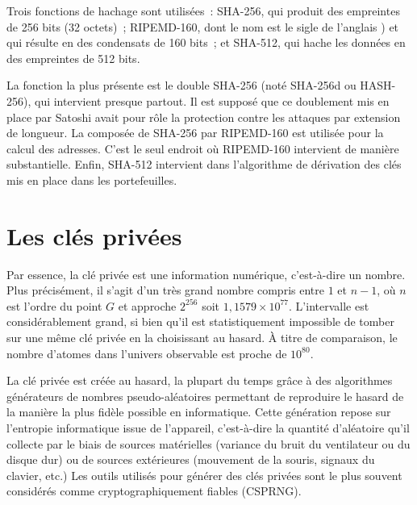 Trois fonctions de hachage sont utilisées~: SHA-256, qui produit des empreintes de 256 bits (32 octets)~; RIPEMD-160, dont le nom est le sigle de l'anglais ) et qui résulte en des condensats de 160 bits~; et SHA-512, qui hache les données en des empreintes de 512 bits.

La fonction la plus présente est le double SHA-256 (noté SHA-256d ou HASH-256), qui intervient presque partout. Il est supposé que ce doublement mis en place par Satoshi avait pour rôle la protection contre les attaques par extension de longueur. La composée de SHA-256 par RIPEMD-160 est utilisée pour la calcul des adresses. C'est le seul endroit où RIPEMD-160 intervient de manière substantielle. Enfin, SHA-512 intervient dans l'algorithme de dérivation des clés mis en place dans les portefeuilles.

\section*{Les clés privées}

Par essence, la clé privée est une information numérique, c'est-à-dire un nombre. Plus précisément, il s'agit d'un très grand nombre compris entre $1$ et $n-1$, où $n$ est l'ordre du point $G$ et approche $2^{256}$ soit $1,1579 \times 10^{77}$. L'intervalle est considérablement grand, si bien qu'il est statistiquement impossible de tomber sur une même clé privée en la choisissant au hasard. À titre de comparaison, le nombre d'atomes dans l'univers observable est proche de $10^{80}$.


La clé privée est créée au hasard, la plupart du temps grâce à des algorithmes générateurs de nombres pseudo-aléatoires permettant de reproduire le hasard de la manière la plus fidèle possible en informatique. Cette génération repose sur l'entropie informatique issue de l'appareil, c'est-à-dire la quantité d'aléatoire qu'il collecte par le biais de sources matérielles (variance du bruit du ventilateur ou du disque dur) ou de sources extérieures (mouvement de la souris, signaux du clavier, etc.) Les outils utilisés pour générer des clés privées sont le plus souvent considérés comme cryptographiquement fiables (CSPRNG). %

